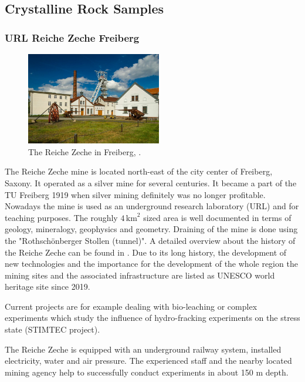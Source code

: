 \subsection{Crystalline Rock Samples}
\label{subsec:crystalline}

\subsubsection{URL Reiche Zeche Freiberg}

\begin{figure}
\centering
\includegraphics[width=5.9cm]{figures/reiche-zeche.jpg}
\caption{The Reiche Zeche in Freiberg, \cite{ReicheZechePicture}.}
\end{figure}
The Reiche Zeche mine is located north-east of the city center of Freiberg, Saxony. It operated as a silver mine for several centuries. It became a part of the TU Freiberg 1919 when silver mining definitely was no longer profitable. Nowadays the mine is used as an underground research laboratory (URL) and for teaching purposes. The roughly $4\,\text{km}^2$ sized area is well documented in terms of geology, mineralogy, geophysics and geometry. Draining of the mine is done using the "Rothsch\"onberger Stollen (tunnel)". A detailed overview about the history of the Reiche Zeche can be found in \cite{ReicheZecheHistory}.
%
Due to its long history, the development of new technologies and the importance for the development of the whole region the mining sites and the associated infrastructure are listed as UNESCO world heritage site since 2019.

Current projects are for example dealing with bio-leaching or complex experiments which study the influence of hydro-fracking experiments on the stress state (STIMTEC project).

The Reiche Zeche is equipped with an underground railway system, installed electricity, water and air pressure. The experienced staff and the nearby located mining agency help to successfully conduct experiments in about 150 m depth. 

